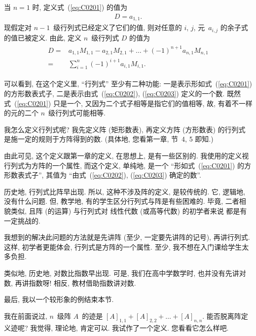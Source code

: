 \documentclass[%
    UTF8,%
    fontset=none,%
    punct=kaiming,%
    zihao=-4,%
    a4paper,%
    oneside,%
]{ctexbook}
\let\emph\relax
\begin{document}
\begin{definition}
    当 \(n = 1\) 时, 定义式~(\ref{eq:C0201}) 的值为
    \begin{align}
        D = a_{1,1}.
        \label{eq:C0202}
    \end{align}
    现假定对 \(n-1\)~级行列式已经定义了它们的值,
    则对任意的 \(i\), \(j\),
    元~\(a_{i,j}\) 的余子式的值已被定义.
    由此, 定义 \(n\)~级行列式 \(D\) 的值为
    \begin{align}
        \begin{aligned}
            D
            = {} &
            a_{1,1} M_{1,1} - a_{2,1} M_{2,1} + \dots +
            (-1)^{n+1} a_{n,1} M_{n,1}
            \\
            = {} &
            \sum_{i = 1}^{n} {(-1)^{i+1} a_{i,1} M_{i,1}}.
        \end{aligned}
        \label{eq:C0203}
    \end{align}
\end{definition}

可以看到, 在这个定义里,
``行列式'' 至少有二种功能:
一是表示形如式~(\ref{eq:C0201}) 的方形数表式子,
二是表示由式~(\ref{eq:C0202}), (\ref{eq:C0203})
定义的一个数.
既然式~(\ref{eq:C0201}) 只是一个\emph{式子},
又因为二个式子相等是指它们的值相等,
故, 有着不一样的元的二个 \(n\)~级行列式可能相等.

我怎么定义行列式呢?
我先定义阵 (矩形数表),
再定义方阵 (方形数表) 的行列式%
是施一定的规则于方阵得到的数.
(具体地, 您看第一章, 节~4, 5 即知.)

由此可见, 这个定义跟第一章的定义,
在思想上, 是有一些区别的.
我使用的定义视行列式为方阵的一个属性,
而这个定义, 单纯地, 是一个
``形如式~(\ref{eq:C0201}) 的方形数表式子'',
其值为
``由式~(\ref{eq:C0202}), (\ref{eq:C0203}) 确定的数''.

历史地, 行列式比阵早出现.
所以, 这种不涉及阵的定义, 是较传统的.
它, 逻辑地, 没有什么问题.
但, 教学地, 有的学生区分行列式与阵是有些困难的.
毕竟, 二者相貌类似,
且阵 (的运算) 与行列式对%
线性代数 (或高等代数) 的初学者来说%
都是有一定挑战的.

我想到的解决此问题的方法就是先讲阵
(至少, 一定要先讲阵的记号),
再讲行列式.
这样, 初学者更能体会,
行列式是方阵的一个属性.
至少, 我不想在入门课给学生太多负担.

类似地, 历史地, 对数比指数早出现.
可是, 我们在高中学数学时,
也并没有先讲对数, 再讲指数呀!
相反, 教材借助指数讲对数.

\vspace{2ex}

最后, 我以一个较形象的例结束本节.

我在前面说过,
\(n\)~级阵 \(A\)~的迹是
\([A]_{1,1} + [A]_{2,2} + \dots + [A]_{n,n}\).
能否脱离阵定义迹呢?
我觉得, 理论地, 肯定可以.
我试作了一个定义.
您看看它怎么样吧.
\end{document}
